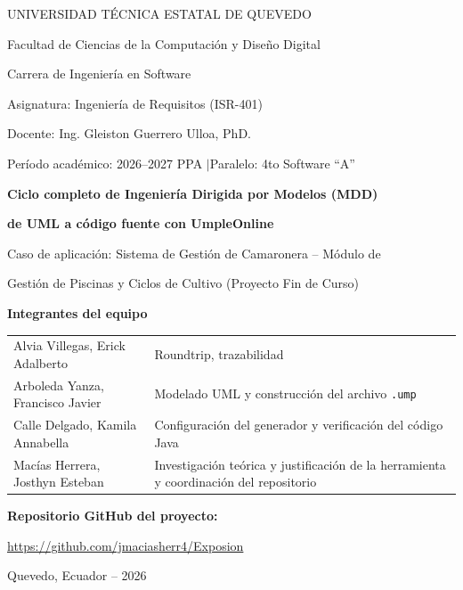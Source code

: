 \documentclass[11pt,a4paper]{article}
\title{\vspace{-2cm}}
\date{}
\begin{document}
\begin{titlepage}
\centering
{\large UNIVERSIDAD T\'ECNICA ESTATAL DE QUEVEDO\par}
{\large Facultad de Ciencias de la Computaci\'on y Dise\~no Digital\par}
{\large Carrera de Ingenier\'ia en Software\par}
\vspace{1.2cm}
{\small Asignatura: Ingenier\'ia de Requisitos (ISR-401)\par}
{\small Docente: Ing. Gleiston Guerrero Ulloa, PhD.\par}
{\small Per\'iodo acad\'emico: 2026--2027 PPA \quad$\vert$\quad Paralelo: 4to Software ``A''\par}
\vspace{1.8cm}
{\Large\bfseries Ciclo completo de Ingenier\'ia Dirigida por Modelos (MDD)\par}
{\Large\bfseries de UML a c\'odigo fuente con UmpleOnline\par}
\vspace{0.4cm}
{\large Caso de aplicaci\'on: Sistema de Gesti\'on de Camaronera -- M\'odulo de\par}
{\large Gesti\'on de Piscinas y Ciclos de Cultivo (Proyecto Fin de Curso)\par}
\vspace{1.6cm}
{\bfseries Integrantes del equipo}\par
\vspace{0.3cm}
\begin{tabular}{ll}
Alvia Villegas, Erick Adalberto & Roundtrip, trazabilidad \\
Arboleda Yanza, Francisco Javier & Modelado UML y construcci\'on del archivo \texttt{.ump} \\
Calle Delgado, Kamila Annabella & Configuraci\'on del generador y verificaci\'on del c\'odigo Java \\
Mac\'ias Herrera, Josthyn Esteban & Investigaci\'on te\'orica y justificaci\'on de la herramienta y coordinaci\'on del repositorio \\
\end{tabular}
\vspace{1.8cm}

{\bfseries Repositorio GitHub del proyecto:}\par
\vspace{0.2cm}
\url{https://github.com/jmaciasherr4/Exposion}
\vspace{2.5cm}

\vfill
{\small Quevedo, Ecuador -- 2026\par}
\end{titlepage}
\end{document}
